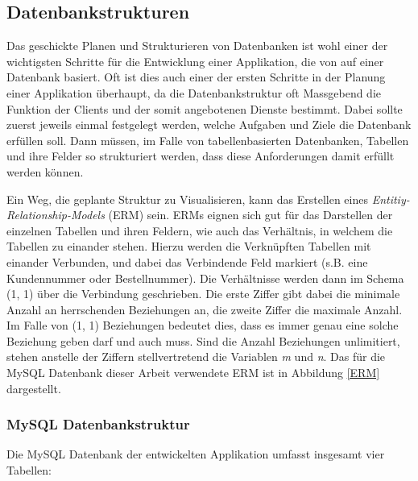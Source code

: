 \documentclass[../main.tex]{subfiles}
\begin{document}
	\subsection{Datenbankstrukturen}
	Das geschickte Planen und Strukturieren von Datenbanken ist wohl einer der wichtigsten Schritte für die Entwicklung einer Applikation, die von auf einer Datenbank basiert. Oft ist dies auch einer der ersten Schritte in der Planung einer Applikation überhaupt, da die Datenbankstruktur oft Massgebend die Funktion der Clients und der somit angebotenen Dienste bestimmt. Dabei sollte zuerst jeweils einmal festgelegt werden, welche Aufgaben und Ziele die Datenbank erfüllen soll. Dann müssen, im Falle von tabellenbasierten Datenbanken, Tabellen und ihre Felder so strukturiert werden, dass diese Anforderungen damit erfüllt werden können. 
	
	Ein Weg, die geplante Struktur zu Visualisieren, kann das Erstellen eines \emph{Entitiy-Relationship-Models} (ERM) sein. ERMs eignen sich gut für das Darstellen der einzelnen Tabellen und ihren Feldern, wie auch das Verhältnis, in welchem die Tabellen zu einander stehen. Hierzu werden die Verknüpften Tabellen mit einander Verbunden, und dabei das Verbindende Feld markiert (s.B. eine Kundennummer oder Bestellnummer). Die Verhältnisse werden dann im Schema (1, 1) über die Verbindung geschrieben. Die erste Ziffer gibt dabei die minimale Anzahl an herrschenden Beziehungen an, die zweite Ziffer die maximale Anzahl. Im Falle von (1, 1) Beziehungen bedeutet dies, dass es immer genau eine solche Beziehung geben darf und auch muss. Sind die Anzahl Beziehungen unlimitiert, stehen anstelle der Ziffern stellvertretend die Variablen \emph{m} und \emph{n}. Das für die MySQL Datenbank dieser Arbeit verwendete ERM ist in Abbildung \ref{ERM} dargestellt.
	
	\subsubsection{MySQL Datenbankstruktur} \label{MySQLStructure}
	Die MySQL Datenbank der entwickelten Applikation umfasst insgesamt vier Tabellen:
	
\end{document}
